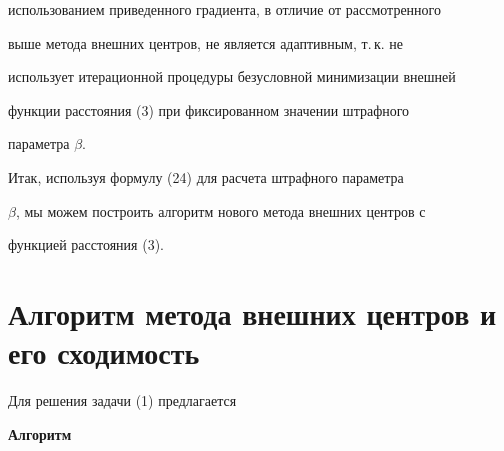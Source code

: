 использованием приведенного градиента, в отличие от рассмотренного 


выше метода внешних центров, не является адаптивным, т.\,к.{} не 


использует итерационной процедуры безусловной минимизации внешней 


функции расстояния (3) при фиксированном значении штрафного 


параметра $\beta$. 


 


Итак, используя формулу (24) для расчета штрафного параметра 


$\beta$, мы можем построить алгоритм нового метода внешних центров с 


функцией расстояния (3). 


 


\section{Алгоритм метода внешних центров и его сходимость} 


 


Для решения задачи (1) предлагается 


 


{\bf Алгоритм} 


